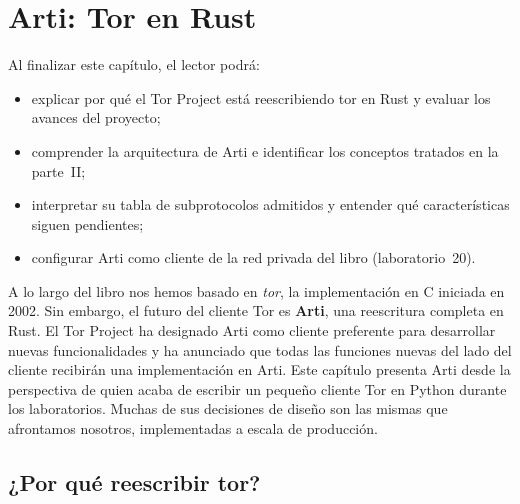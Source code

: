 \chapter{Arti: Tor en Rust}\label{cap:30-arti}

\begin{obiettivi}
Al finalizar este capítulo, el lector podrá:
\begin{itemize}[nosep]
  \item explicar por qué el Tor Project está reescribiendo tor en Rust y evaluar los avances del proyecto;
  \item comprender la arquitectura de Arti e identificar los conceptos tratados en la parte~II;
  \item interpretar su tabla de subprotocolos admitidos y entender qué características siguen pendientes;
  \item configurar Arti como cliente de la red privada del libro (laboratorio~20).
\end{itemize}
\end{obiettivi}

A lo largo del libro nos hemos basado en \emph{tor}, la implementación en C iniciada en 2002. Sin embargo, el futuro del cliente Tor es \textbf{Arti}, una reescritura completa en Rust. El Tor Project ha designado Arti como cliente preferente para desarrollar nuevas funcionalidades y ha anunciado que todas las funciones nuevas del lado del cliente recibirán una implementación en Arti. Este capítulo presenta Arti desde la perspectiva de quien acaba de escribir un pequeño cliente Tor en Python durante los laboratorios. Muchas de sus decisiones de diseño son las mismas que afrontamos nosotros, implementadas a escala de producción.

\section{¿Por qué reescribir tor?}\label{sec:arti-perche}

